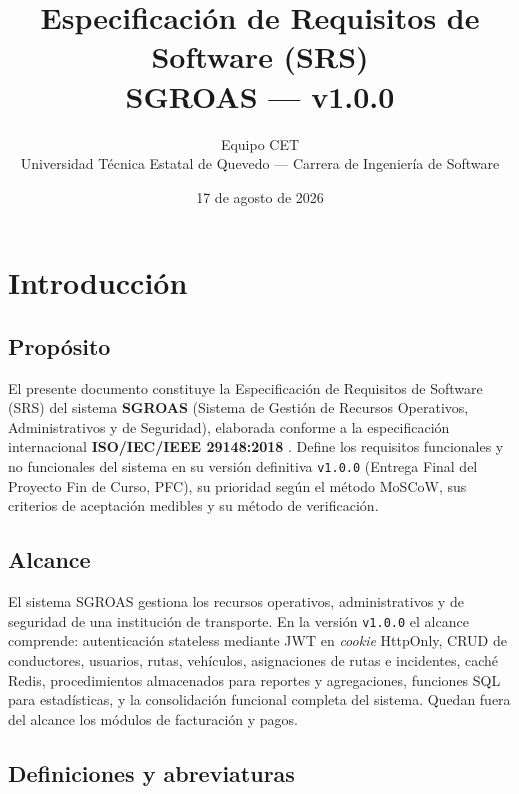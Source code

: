 \documentclass[12pt,a4paper]{article}
\title{Especificación de Requisitos de Software (SRS) \\ SGROAS --- v1.0.0}
\author{Equipo CET \\ Universidad Técnica Estatal de Quevedo --- Carrera de Ingeniería de Software}
\date{17 de agosto de 2026}
\begin{document}
\maketitle
\tableofcontents
\clearpage

\section{Introducción}
\label{sec:introduccion}

\subsection{Propósito}
\label{sec:proposito}

El presente documento constituye la Especificación de Requisitos de Software (SRS) del
sistema \textbf{SGROAS} (Sistema de Gestión de Recursos Operativos, Administrativos y de
Seguridad), elaborada conforme a la especificación internacional \textbf{ISO/IEC/IEEE
29148:2018} \cite{iso29148}. Define los requisitos funcionales y no funcionales del sistema
en su versión definitiva \texttt{v1.0.0} (Entrega Final del Proyecto Fin de Curso, PFC),
su prioridad según el método MoSCoW, sus criterios de aceptación medibles y su método de
verificación.

\subsection{Alcance}
\label{sec:alcance}

El sistema SGROAS gestiona los recursos operativos, administrativos y de seguridad de una
institución de transporte. En la versión \texttt{v1.0.0} el alcance comprende:
autenticación stateless mediante JWT en \textit{cookie} HttpOnly, CRUD de conductores,
usuarios, rutas, vehículos, asignaciones de rutas e incidentes, caché Redis, procedimientos
almacenados para reportes y agregaciones, funciones SQL para estadísticas, y la
consolidación funcional completa del sistema. Quedan fuera del alcance los módulos de
facturación y pagos.

\subsection{Definiciones y abreviaturas}
\label{sec:definiciones}
\end{document}
